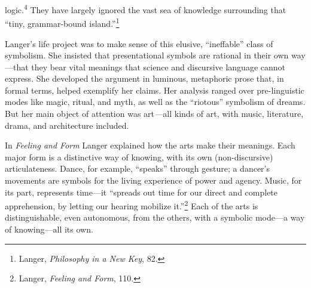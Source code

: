 \documentclass{tufte-handout}
\begin{document}



\noindent logic.\textsuperscript{4}\setcounter{footnote}{4} They have largely ignored the vast sea of knowledge
surrounding that ``tiny, grammar-bound island.''\footnote{Langer,
  \emph{Philosophy in a New Key}, 82.}

Langer's life project was to make sense of this elusive, ``ineffable''
class of symbolism. She insisted that presentational symbols are
rational in their own way---that they bear vital meanings that science
and discursive language cannot express. She developed the argument in
luminous, metaphoric prose that, in formal terms, helped exemplify her
claims. Her analysis ranged over pre-linguistic modes like magic,
ritual, and myth, as well as the ``riotous'' symbolism of dreams. But
her main object of attention was art\emph{---}all kinds of art, with
music, literature, drama, and architecture included.

In \emph{Feeling and Form} Langer explained how the arts make their
meanings. Each major form is a distinctive way of knowing, with its own
(non-discursive) articulateness. Dance, for example, ``speaks'' through
gesture; a dancer's movements are symbols for the living experience of
power and agency. Music, for its part, represents time---it ``spreads
out time for our direct and complete apprehension, by letting our
hearing mobilize it.''\footnote{Langer, \emph{Feeling and Form}, 110.}
Each of the arts is distinguishable, even autonomous, from the others,
with a symbolic mode---a way of knowing---all its own.
\end{document}
